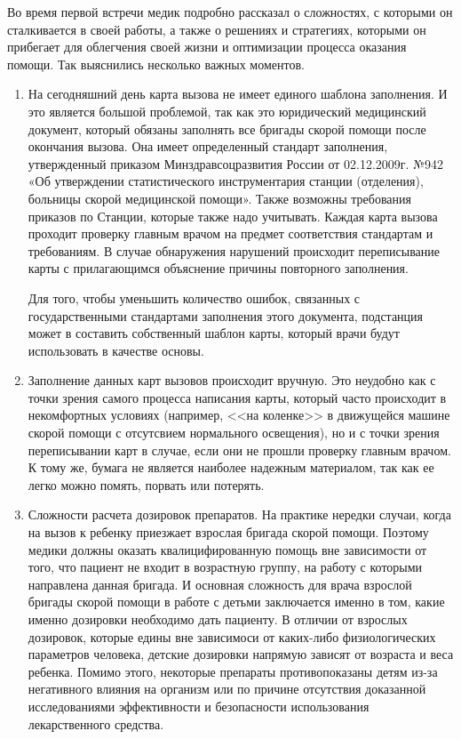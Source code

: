 Во время первой встречи медик подробно рассказал о сложностях, с которыми он сталкивается в своей работы, а также о решениях и стратегиях, которыми он прибегает для облегчения своей жизни и оптимизации процесса оказания помощи. Так выяснились несколько важных моментов.
\begin{enumerate}
    \item На сегодняшний день карта вызова не имеет единого шаблона заполнения. И это является большой проблемой, так как это юридический медицинский документ, который обязаны заполнять все бригады скорой помощи после окончания вызова. Она имеет определенный стандарт заполнения, утвержденный приказом Минздравсоцразвития России от 02.12.2009г. №942 «Об утверждении статистического инструментария станции (отделения), больницы скорой медицинской помощи». Также возможны требования приказов по Станции, которые также надо учитывать. Каждая карта вызова проходит проверку главным врачом на предмет соответствия стандартам и требованиям. В случае обнаружения нарушений происходит переписывание карты с прилагающимся объяснение причины повторного заполнения.
    
    Для того, чтобы уменьшить количество ошибок, связанных с государственными стандартами заполнения этого документа, подстанция может в составить собственный шаблон карты, который врачи будут использовать в качестве основы.
    
    \item Заполнение данных карт вызовов происходит вручную. Это неудобно как с точки зрения самого процесса написания карты, который часто происходит в некомфортных условиях (например, <<на коленке>> в движущейся машине скорой помощи с отсутсвием нормального освещения), но и с точки зрения переписывании карт в случае, если они не прошли проверку главным врачом. К тому же, бумага не является наиболее надежным материалом, так как ее легко можно помять, порвать или потерять.
    
    \item Сложности расчета дозировок препаратов. На практике нередки случаи, когда на вызов к ребенку приезжает взрослая бригада скорой помощи. Поэтому медики должны оказать квалицифированную помощь вне зависимости от того, что пациент не входит в возрастную группу, на работу с которыми направлена данная бригада. И основная сложность для врача взрослой бригады скорой помощи в работе с детьми заключается именно в том, какие именно дозировки необходимо дать пациенту. В отличии от взрослых дозировок, которые едины вне зависимоси от каких-либо физиологических параметров человека, детские дозировки напрямую зависят от возраста и веса ребенка. Помимо этого, некоторые препараты противопоказаны детям из-за негативного влияния на организм или по причине отсутствия доказанной исследованиями эффективности и безопасности использования лекарственного средства.
    

\end{enumerate}
